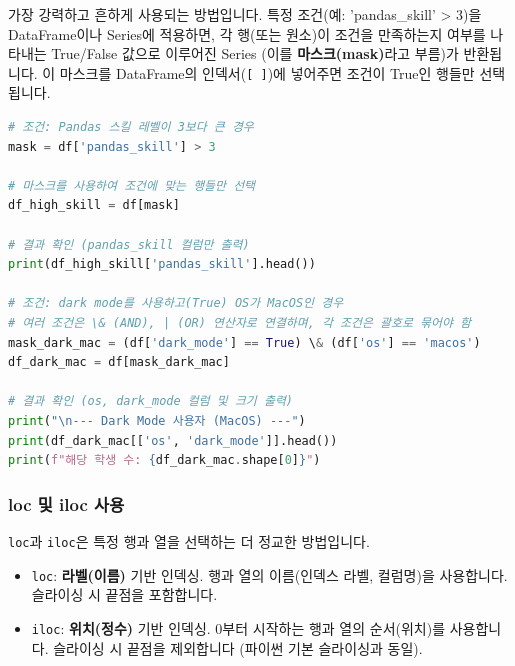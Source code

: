 \documentclass[11pt,a4paper]{book}
\theoremstyle{definition}
\begin{document}
가장 강력하고 흔하게 사용되는 방법입니다. 특정 조건(예: 'pandas\_skill' > 3)을 DataFrame이나 Series에 적용하면, 각 행(또는 원소)이 조건을 만족하는지 여부를 나타내는 True/False 값으로 이루어진 Series (이를 \textbf{마스크(mask)}라고 부름)가 반환됩니다. 이 마스크를 DataFrame의 인덱서(\texttt{[ ]})에 넣어주면 조건이 True인 행들만 선택됩니다.

\begin{codeexamplebox}
\begin{lstlisting}[language=Python, caption={Boolean Indexing으로 필터링}, label={lst:boolean_indexing}, breaklines=true]
# 조건: Pandas 스킬 레벨이 3보다 큰 경우
mask = df['pandas_skill'] > 3

# 마스크를 사용하여 조건에 맞는 행들만 선택
df_high_skill = df[mask]

# 결과 확인 (pandas_skill 컬럼만 출력)
print(df_high_skill['pandas_skill'].head())

# 조건: dark mode를 사용하고(True) OS가 MacOS인 경우
# 여러 조건은 \& (AND), | (OR) 연산자로 연결하며, 각 조건은 괄호로 묶어야 함
mask_dark_mac = (df['dark_mode'] == True) \& (df['os'] == 'macos')
df_dark_mac = df[mask_dark_mac]

# 결과 확인 (os, dark_mode 컬럼 및 크기 출력)
print("\n--- Dark Mode 사용자 (MacOS) ---")
print(df_dark_mac[['os', 'dark_mode']].head())
print(f"해당 학생 수: {df_dark_mac.shape[0]}")
\end{lstlisting}
\end{codeexamplebox}

\subsubsection{loc 및 iloc 사용}

\texttt{loc}과 \texttt{iloc}은 특정 행과 열을 선택하는 더 정교한 방법입니다.

\begin{itemize}
    \item \texttt{loc}: \textbf{라벨(이름)} 기반 인덱싱. 행과 열의 이름(인덱스 라벨, 컬럼명)을 사용합니다. 슬라이싱 시 끝점을 포함합니다.
    \item \texttt{iloc}: \textbf{위치(정수)} 기반 인덱싱. 0부터 시작하는 행과 열의 순서(위치)를 사용합니다. 슬라이싱 시 끝점을 제외합니다 (파이썬 기본 슬라이싱과 동일).
\end{itemize}
\end{document}
